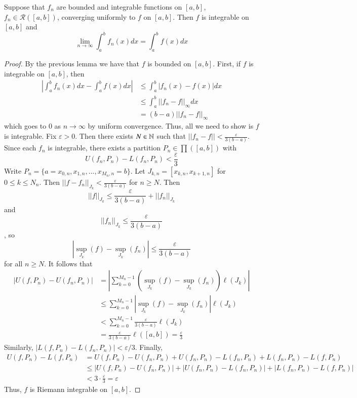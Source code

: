 \begin{thm}
    Suppose that $f_n$ are bounded and integrable functions on $[a,b]$, $f_n \in \mathcal{R}([a,b])$, converging uniformly to $f$ on $[a,b]$. Then $f$ is integrable on $[a,b]$ and $$\lim\limits_{n\rightarrow \infty}\int_a^bf_n(x)dx = \int_a^bf(x)dx$$
\end{thm}
\begin{proof}
    By the previous lemma we have that $f$ is bounded on $[a,b]$. First, if $f$ is integrable on $[a,b]$, then \begin{align*}
        \left|\int_a^bf_n(x)dx - \int_a^bf(x)dx\right| &\leq \int_a^b|f_n(x)-f(x)|dx \\
        &\leq \int_a^b||f_n-f||_{\infty}dx \\
        &= (b-a)||f_n-f||_{\infty}
    \end{align*}
    which goes to $0$ as $n\rightarrow \infty$ by uniform convergence. Thus, all we need to show is $f$ is integrable. Fix $\varepsilon > 0$. Then there exists $N \in \mathbb N$ such that $||f_n - f|| < \frac{\varepsilon}{3(b-a)}$. Since each $f_n$ is integrable, there exists a partition $P_n \in \prod([a,b])$ with $$U(f_n,P_n) - L(f_n,P_n) < \frac{\varepsilon}{3}$$ Write $P_n = \{a=x_{0,n},x_{1,n},...,x_{M_n,n} = b\}$. Let $J_{k,n} = [x_{k,n},x_{k+1,n}]$ for $0 \leq k \leq N_n$. Then $||f-f_n||_{J_k} < \frac{\varepsilon}{3(b-a)}$ for $n \geq N$. Then $$||f||_{J_k} \leq \frac{\varepsilon}{3(b-a)} + ||f_n||_{J_k}$$ and $$||f_n||_{J_k} \leq \frac{\varepsilon}{3(b-a)}$$, so $$|\sup_{J_k}(f) - \sup_{J_k}(f_n)| \leq \frac{\varepsilon}{3(b-a)}$$ for all $n \geq N$. It follows that \begin{align*}
        |U(f,P_n) - U(f_n,P_n)| &= \left|\sum_{k=0}^{M_n-1}(\sup_{J_k}(f) - \sup_{J_k}(f_n))\ell(J_k)\right| \\
        &\leq \sum_{k=0}^{M_n - 1}|\sup_{J_k}(f) - \sup_{J_k}(f_n)|\ell(J_k) \\
        &< \sum_{k=0}^{M_n-1}\frac{\varepsilon}{3(b-a)}\ell(J_k) \\
        &= \frac{\varepsilon}{3(b-a)}\ell([a,b]) = \frac{\varepsilon}{3}
    \end{align*}
    Similarly, $|L(f,P_n) - L(f_n,P_n)| < \varepsilon/3$. Finally, \begin{align*}
        U(f,P_n) - L(f,P_n) &= U(f,P_n) - U(f_n,P_n) + U(f_n,P_n) - L(f_n,P_n) + L(f_n,P_n) - L(f,P_n) \\
        &\leq |U(f,P_n) - U(f_n,P_n)| + |U(f_n,P_n) - L(f_n,P_n)| + |L(f_n,P_n) - L(f,P_n)|\\
        &< 3\cdot \frac{\varepsilon}{3} = \varepsilon
    \end{align*}
    Thus, $f$ is Riemann integrable on $[a,b]$.
\end{proof}




